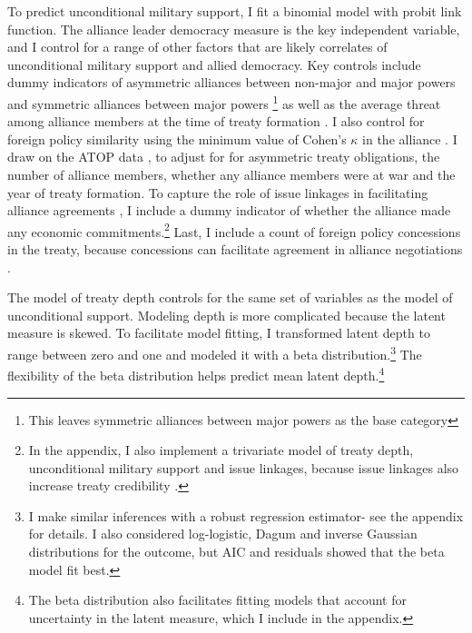 \documentclass[12pt]{article}
\begin{document}
To predict unconditional military support, I fit a binomial model with probit link function. 
The alliance leader democracy measure is the key independent variable, and I control for a range of other factors that are likely correlates of unconditional military support and allied democracy. 
Key controls include dummy indicators of asymmetric alliances between non-major and major powers and symmetric alliances between major powers \citep{Mattes2012}\footnote{This leaves symmetric alliances between major powers as the base category} as well as the average threat among alliance members at the time of treaty formation \citep{LeedsSavun2007}. 
I also control for foreign policy similarity using the minimum value of Cohen's $\kappa$ in the alliance \citep{Hage2011}.
I draw on the ATOP data \citep{Leedsetal2002}, to adjust for for asymmetric treaty obligations, the number of alliance members, whether any alliance members were at war and the year of treaty formation. 
To capture the role of issue linkages in facilitating alliance agreements \citep{Poast2012}, I include a dummy indicator of whether the alliance made any economic commitments.\footnote{In the appendix, I also implement a trivariate model of treaty depth, unconditional military support and issue linkages, because issue linkages also increase treaty credibility \citep{ Poast2013}.}  
Last, I include a count of foreign policy concessions in the treaty, because concessions can facilitate agreement in alliance negotiations \citep{Johnson2015}. 


The model of treaty depth controls for the same set of variables as the model of unconditional support.  
Modeling depth is more complicated because the latent measure is skewed.
To facilitate model fitting, I transformed latent depth to range between zero and one and modeled it with a beta distribution.\footnote{I make similar inferences with a robust regression estimator- see the appendix for details. I also considered log-logistic, Dagum and inverse Gaussian distributions for the outcome, but AIC and residuals showed that the beta model fit best.}
The flexibility of the beta distribution helps predict mean latent depth.\footnote{The beta distribution also facilitates fitting models that account for uncertainty in the latent measure, which I include in the appendix.} 
\end{document}
